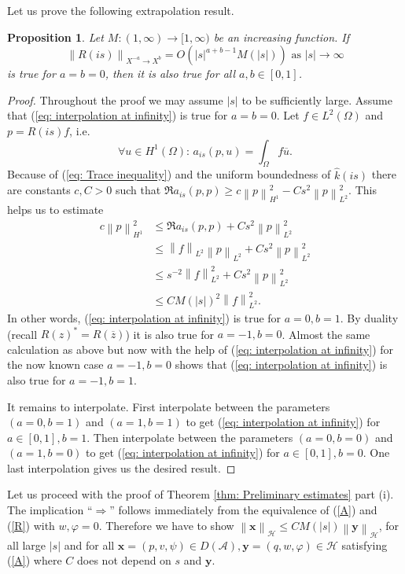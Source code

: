 \documentclass{amsart}
\newcommand{\abs}[1]{\left|#1\right|}
\newcommand{\norm}[1]{\left\| #1 \right\|}
\newcommand{\A}{\mathcal{A}}
\newcommand{\xnice}{\mathbf{x}}
\newcommand{\ynice}{\mathbf{y}}
\newcommand{\Ho}{\mathcal{H}}
\newtheorem{Proposition}[Theorem]{Proposition}
\begin{document}
Let us prove the following extrapolation result.
\begin{Proposition}\label{thm: interpolation at infinity}
 Let $M:(1,\infty)\rightarrow[1,\infty)$ be an increasing function. If 
 \begin{equation}\label{eq: interpolation at infinity}
  \norm{R(is)}_{X^{-a}\rightarrow X^{b}} = O(\abs{s}^{a+b-1}M(\abs{s})) \text{ as } \abs{s}\rightarrow \infty
 \end{equation}
 is true for $a=b=0$, then it is also true for all $a,b\in[0,1]$.
\end{Proposition}
\begin{proof}
 Throughout the proof we may assume $\abs{s}$ to be sufficiently large. Assume that (\ref{eq: interpolation at infinity}) is true for $a = b = 0$. Let $f\in L^2(\Omega)$ and $p=R(is)f$, i.e. 
 \begin{equation}\nonumber 
 \forall u\in H^1(\Omega):\, a_{is}(p,u) = \int_{\Omega}f\overline{u} .
 \end{equation}
 Because of (\ref{eq: Trace inequality}) and the uniform boundedness of $\hat{k}(is)$ there are constants $c,C>0$ such that $\Re a_{is}(p,p)\geq c\norm{p}_{H^1}^2-Cs^2\norm{p}_{L^2}^2$. This helps us to estimate
 \begin{align*}
  c\norm{p}_{H^1}^2 &\leq \Re a_{is}(p,p) + Cs^2\norm{p}_{L^2}^2 \\
  &\leq \norm{f}_{L^2}\norm{p}_{L^2} + Cs^2\norm{p}_{L^2}^2 \\
  &\leq s^{-2}\norm{f}_{L^2}^2 + Cs^2\norm{p}_{L^2}^2 \\
  &\leq C M(\abs{s})^2 \norm{f}_{L^2}^2.
 \end{align*}
 In other words, (\ref{eq: interpolation at infinity}) is true for $a=0, b=1$. By duality (recall $R(z)^* = R(\overline{z})$) it is also true for $a=-1, b=0$. Almost the same calculation as above but now with the help of (\ref{eq: interpolation at infinity}) for the now known case $a=-1, b=0$ shows that (\ref{eq: interpolation at infinity}) is also true for $a=-1, b=1$. 
 
 It remains to interpolate. First interpolate between the parameters $(a=0,b=1)$ and $(a=1,b=1)$ to get (\ref{eq: interpolation at infinity}) for $a\in[0,1], b=1$. Then interpolate between the parameters $(a=0,b=0)$ and $(a=1,b=0)$ to get (\ref{eq: interpolation at infinity}) for $a\in[0,1], b=0$. One last interpolation gives us the desired result.
\end{proof}
Let us proceed with the proof of Theorem \ref{thm: Preliminary estimates} part (i). The implication ``$\Rightarrow$'' follows immediately from the equivalence of (\ref{A}) and (\ref{R}) with $w, \varphi = 0$. Therefore we have to show $\norm{\xnice}_{\Ho}\leq CM(\abs{s}) \norm{\ynice}_{\Ho}$, for all large $\abs{s}$ and for all $\xnice=(p,v,\psi)\in D(\A), \ynice=(q,w,\varphi)\in\Ho$ satisfying (\ref{A}) where $C$ does not depend on $s$ and $\ynice$.
\end{document}

